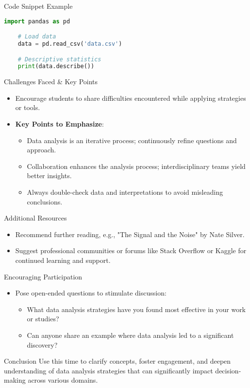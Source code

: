 \documentclass[aspectratio=169]{beamer}
\begin{document}
\begin{frame}[fragile]{Code Snippet Example}
    \begin{lstlisting}[language=Python]
    import pandas as pd

    # Load data
    data = pd.read_csv('data.csv')

    # Descriptive statistics
    print(data.describe())
    \end{lstlisting}
\end{frame}

\begin{frame}[fragile]{Challenges Faced \& Key Points}
    \begin{itemize}
        \item Encourage students to share difficulties encountered while applying strategies or tools.
        \item \textbf{Key Points to Emphasize}:
            \begin{itemize}
                \item Data analysis is an iterative process; continuously refine questions and approach.
                \item Collaboration enhances the analysis process; interdisciplinary teams yield better insights.
                \item Always double-check data and interpretations to avoid misleading conclusions.
            \end{itemize}
    \end{itemize}
\end{frame}

\begin{frame}[fragile]{Additional Resources}
    \begin{itemize}
        \item Recommend further reading, e.g., "The Signal and the Noise" by Nate Silver.
        \item Suggest professional communities or forums like Stack Overflow or Kaggle for continued learning and support.
    \end{itemize}
\end{frame}

\begin{frame}[fragile]{Encouraging Participation}
    \begin{itemize}
        \item Pose open-ended questions to stimulate discussion:
            \begin{itemize}
                \item What data analysis strategies have you found most effective in your work or studies?
                \item Can anyone share an example where data analysis led to a significant discovery?
            \end{itemize}
    \end{itemize}
\end{frame}

\begin{frame}[fragile]{Conclusion}
    Use this time to clarify concepts, foster engagement, and deepen understanding of data analysis strategies that can significantly impact decision-making across various domains.
\end{frame}
\end{document}
